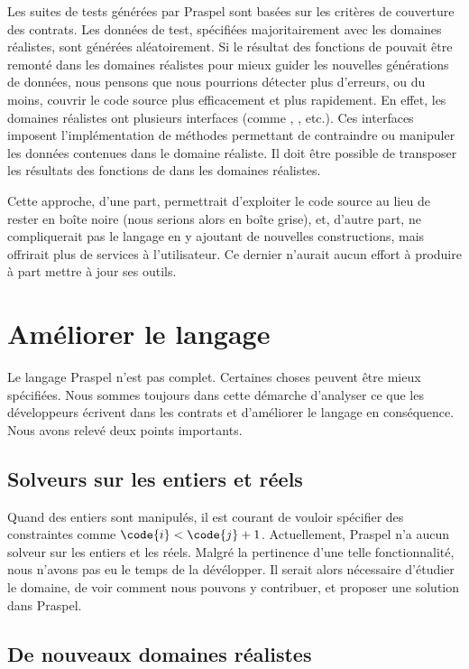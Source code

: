 Les suites de tests générées par Praspel sont basées sur les critères de
couverture des contrats. Les données de test, spécifiées majoritairement avec
les domaines réalistes, sont générées aléatoirement. Si le résultat des
fonctions de  pouvait être remonté dans les domaines
réalistes pour mieux guider les nouvelles générations de données, nous pensons
que nous pourrions détecter plus d'erreurs, ou du moins, couvrir le code source
plus efficacement et plus rapidement. En effet, les domaines réalistes ont
plusieurs interfaces (comme , , 
etc.). Ces interfaces imposent l'implémentation de méthodes permettant de
contraindre ou manipuler les données contenues dans le domaine réaliste. Il doit
être possible de transposer les résultats des fonctions de 
dans les domaines réalistes.

Cette approche, d'une part, permettrait d'exploiter le code source au lieu de
rester en boîte noire (nous serions alors en boîte grise), et, d'autre part, ne
compliquerait pas le langage en y ajoutant de nouvelles constructions, mais
offrirait plus de services à l'utilisateur. Ce dernier n'aurait aucun effort à
produire à part mettre à jour ses outils.

\section{Améliorer le langage}

Le langage Praspel n'est pas complet. Certaines choses peuvent être mieux
spécifiées. Nous sommes toujours dans cette démarche d'analyser ce que les
développeurs écrivent dans les contrats et d'améliorer le langage en
conséquence. Nous avons relevé deux points importants.

\subsection{Solveurs sur les entiers et réels}

Quand des entiers sont manipulés, il est courant de vouloir spécifier des
constraintes comme $\code{i} < \code{j} + 1$. Actuellement, Praspel n'a aucun
solveur sur les entiers et les réels. Malgré la pertinence d'une telle
fonctionnalité, nous n'avons pas eu le temps de la dévélopper. Il serait alors
nécessaire d'étudier le domaine, de voir comment nous pouvons y contribuer, et
proposer une solution dans Praspel.

\subsection{De nouveaux domaines réalistes}


